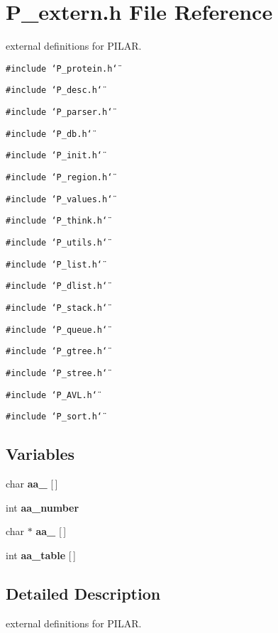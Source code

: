 \section{P\_\-extern.h File Reference}
\label{P__extern_8h}
external definitions for PILAR. 


{\tt \#include \char`\"{}P\_\-protein.h\char`\"{}}\par
{\tt \#include \char`\"{}P\_\-desc.h\char`\"{}}\par
{\tt \#include \char`\"{}P\_\-parser.h\char`\"{}}\par
{\tt \#include \char`\"{}P\_\-db.h\char`\"{}}\par
{\tt \#include \char`\"{}P\_\-init.h\char`\"{}}\par
{\tt \#include \char`\"{}P\_\-region.h\char`\"{}}\par
{\tt \#include \char`\"{}P\_\-values.h\char`\"{}}\par
{\tt \#include \char`\"{}P\_\-think.h\char`\"{}}\par
{\tt \#include \char`\"{}P\_\-utils.h\char`\"{}}\par
{\tt \#include \char`\"{}P\_\-list.h\char`\"{}}\par
{\tt \#include \char`\"{}P\_\-dlist.h\char`\"{}}\par
{\tt \#include \char`\"{}P\_\-stack.h\char`\"{}}\par
{\tt \#include \char`\"{}P\_\-queue.h\char`\"{}}\par
{\tt \#include \char`\"{}P\_\-gtree.h\char`\"{}}\par
{\tt \#include \char`\"{}P\_\-stree.h\char`\"{}}\par
{\tt \#include \char`\"{}P\_\-AVL.h\char`\"{}}\par
{\tt \#include \char`\"{}P\_\-sort.h\char`\"{}}\par
\subsection*{Variables}
\begin{CompactItemize}
\item 
char {\bf aa\_} [$\,$]
\item 
int {\bf aa\_\-number}
\item 
char $\ast$ {\bf aa\_} [$\,$]
\item 
int {\bf aa\_\-table} [$\,$]
\end{CompactItemize}


\subsection{Detailed Description}
external definitions for PILAR.

